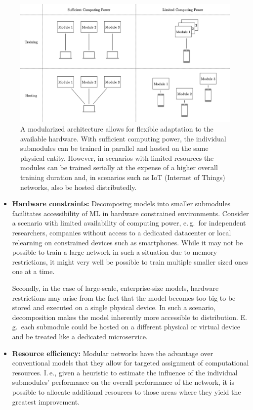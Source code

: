 \begin{itemize}
\begin{figure}[tb]
    \centering
	    \includegraphics[width=\textwidth, trim=0 -25 0 -25, clip]{thesis/graphics/graphics/training_hosting.jpeg}
    \caption{A modularized architecture allows for flexible adaptation to the available hardware. With sufficient computing power, the individual submodules can be trained in parallel and hosted on the same physical entity. However, in scenarios with limited resources the modules can be trained serially at the expense of a higher overall training duration and, in scenarios such as IoT (Internet of Things) networks, also be hosted distributedly.}
    \label{fig:modularization_training_hosting}
\end{figure}        
        
        \begin{itemize}
            \item \textbf{Hardware constraints:} Decomposing models into smaller submodules facilitates accessibility of ML in hardware constrained environments. Consider a scenario with limited availability of computing power, e.\,g.\ for independent researchers, companies without access to a dedicated datacenter or local relearning on constrained devices such as smartphones. While it may not be possible to train a large network in such a situation due to memory restrictions, it might very well be possible to train multiple smaller sized ones one at a time.
            
            Secondly, in the case of large-scale, enterprise-size models, hardware restrictions may arise from the fact that the model becomes too big to be stored and executed on a single physical device. In such a scenario, decomposition makes the model inherently more accessible to distribution. E.\,g.\ each submodule could be hosted on a different physical or virtual device and be treated like a dedicated microservice.
            \item \textbf{Resource efficiency:} Modular networks have the advantage over conventional models that they allow for targeted assignment of computational resources. I.\,e., given a heuristic to estimate the influence of the individual submodules' performance on the overall performance of the network, it is possible to allocate additional resources to those areas where they yield the greatest improvement.
            

\end{itemize}
\end{itemize}
